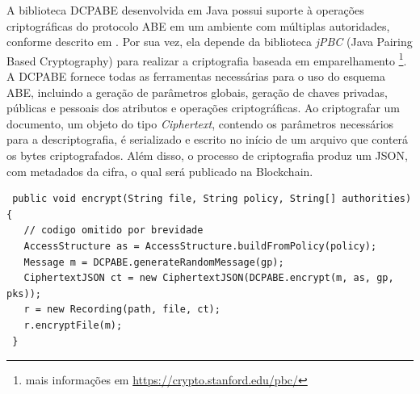 \documentclass[a4paper,11pt]{article}
\begin{document}
A biblioteca DCPABE desenvolvida em Java possui suporte à operações criptográficas do protocolo ABE em um ambiente com múltiplas autoridades, conforme descrito em \cite{Lewko2011}.
Por sua vez, ela depende da biblioteca \emph{jPBC} (Java Pairing Based Cryptography) \cite{DeCaro2011} para realizar a criptografia baseada em emparelhamento
\footnote{mais informações em \href{https://crypto.stanford.edu/pbc/}{https://crypto.stanford.edu/pbc/}}.
A DCPABE fornece todas as ferramentas necessárias para o uso do esquema ABE, incluindo a geração de parâmetros globais, geração de chaves privadas, públicas e pessoais dos atributos e operações criptográficas. %
Ao criptografar um documento, um objeto do tipo \emph{Ciphertext}, contendo os parâmetros necessários para a descriptografia, é serializado e escrito no início de um arquivo que conterá os bytes criptografados. {\color{blue}Além disso, o processo de criptografia produz um JSON, com metadados da cifra, o qual será publicado na Blockchain}.



\begin{lstlisting}
 public void encrypt(String file, String policy, String[] authorities) {
   // codigo omitido por brevidade
   AccessStructure as = AccessStructure.buildFromPolicy(policy);
   Message m = DCPABE.generateRandomMessage(gp);
   CiphertextJSON ct = new CiphertextJSON(DCPABE.encrypt(m, as, gp, pks));
   r = new Recording(path, file, ct);
   r.encryptFile(m);
 }
\end{lstlisting}
\end{document}
